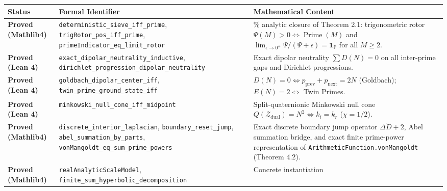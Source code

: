 \documentclass[
  11pt,
]{article}
\newcounter{none} %
\begin{document}
{\def\LTcaptype{none} %
\begin{longtable}[]{@{}
  >{\centering\arraybackslash}p{}
  >{\raggedright\arraybackslash}p{}
  >{\raggedright\arraybackslash}p{}@{}}
\toprule\noalign{}
\begin{minipage}[b]{\linewidth}\centering
Status
\end{minipage} & \begin{minipage}[b]{\linewidth}\raggedright
Formal Identifier
\end{minipage} & \begin{minipage}[b]{\linewidth}\raggedright
Mathematical Content
\end{minipage} \\
\midrule\noalign{}
\endhead
\bottomrule\noalign{}
\endlastfoot
\textbf{Proved (Mathlib4)} & \texttt{deterministic\_sieve\_iff\_prime},
\texttt{trigRotor\_pos\_iff\_prime},
\texttt{primeIndicator\_eq\_limit\_rotor} & 100\% analytic closure of
Theorem 2.1: trigonometric rotor
\(\Psi(M) > 0 \iff \operatorname{Prime}(M)\) and
\(\lim_{\epsilon\to 0^+} \Psi/(\Psi+\epsilon) = \mathbf{1}_{\mathbb{P}}\)
for all \(M \ge 2\). \\
\textbf{Proved (Lean 4)} &
\texttt{exact\_dipolar\_neutrality\_inductive},
\texttt{dirichlet\_progression\_dipolar\_neutrality} & Exact dipolar
neutrality \(\sum D(N) = 0\) on all inter-prime gaps and Dirichlet
progressions. \\
\textbf{Proved (Lean 4)} & \texttt{goldbach\_dipolar\_center\_iff},
\texttt{twin\_prime\_ground\_state\_iff} &
\(D(N) = 0 \iff p_{\text{prev}} + p_{\text{next}} = 2N\) (Goldbach);
\(E(N) = 2 \iff\) Twin Primes. \\
\textbf{Proved (Lean 4)} & \texttt{minkowski\_null\_cone\_iff\_midpoint}
& Split-quaternionic Minkowski null cone
\(Q(\mathcal{Z}_{\text{dual}}) = N^2 \iff k_i = k_r\)
(\(\chi = 1/2\)). \\
\textbf{Proved (Mathlib4)} & \texttt{discrete\_interior\_laplacian},
\texttt{boundary\_reset\_jump}, \texttt{abel\_summation\_by\_parts},
\texttt{vonMangoldt\_eq\_sum\_prime\_powers} & Exact discrete boundary
jump operator \(\Delta \widetilde{D} + 2\), Abel summation bridge, and
exact finite prime-power representation of
\texttt{ArithmeticFunction.vonMangoldt} (Theorem 4.2). \\
\textbf{Proved (Mathlib4)} & \texttt{realAnalyticScaleModel},
\texttt{finite\_sum\_hyperbolic\_decomposition} & Concrete instantiation

\end{longtable}}
\end{document}
